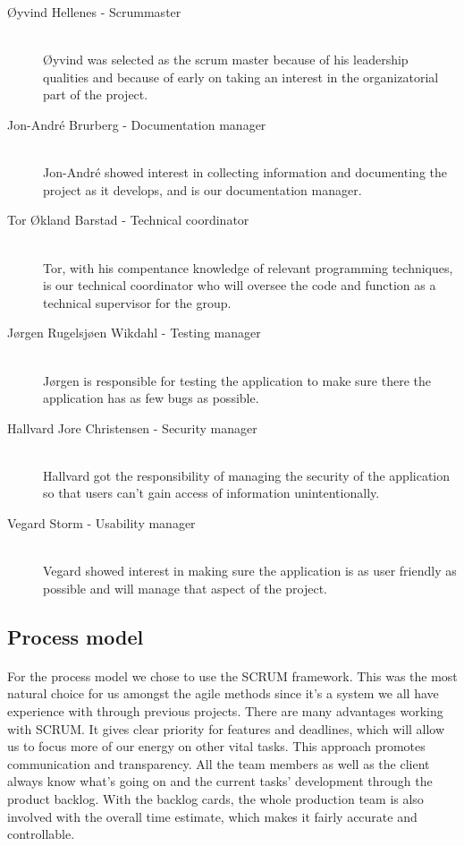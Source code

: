 \documentclass[12pt,a4paper,titlepage]{article}
\begin{document}
				\begin{description}
						\item[Øyvind Hellenes - Scrummaster] \hfill \\
						Øyvind was selected as the scrum master because of his leadership qualities and because of early on taking an interest in the organizatorial part of the project.
						\item[Jon-André Brurberg - Documentation manager] \hfill \\
						Jon-André showed interest in collecting information and documenting the project as it develops, and is our documentation manager.
						\item[Tor Økland Barstad - Technical coordinator]  \hfill \\
						Tor, with his compentance knowledge of relevant programming techniques, is our technical coordinator who will oversee the code and function as a technical supervisor for the group.
						\item[Jørgen Rugelsjøen Wikdahl - Testing manager]  \hfill \\
						Jørgen is responsible for testing the application to make sure there the application has as few bugs as possible.
						\item[Hallvard Jore Christensen - Security manager]  \hfill \\
						Hallvard got the responsibility of managing the security of the application so that users can’t gain access of information unintentionally.
						\item[Vegard Storm - Usability manager] \hfill \\
						Vegard showed interest in making sure the application is as user friendly as possible and will manage that aspect of the project.
				\end{description}

			\subsection{Process model}
				\paragraph{}
For the process model we chose to use the SCRUM framework. This was the most natural choice for us amongst the agile methods since it’s a system we all have experience with through previous projects. There are many advantages working with SCRUM. It gives clear priority for features and deadlines, which will allow us to focus more of our energy on other vital tasks. This approach promotes communication and transparency. All the team members as well as the client always know what’s going on and the current tasks’ development through the product backlog. With the backlog cards, the whole production team is also involved with the overall time estimate, which makes it fairly accurate and controllable.
\end{document}
